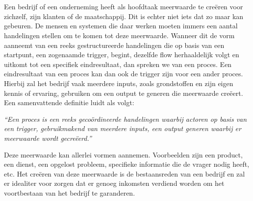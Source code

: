
\chapter{}%
\label{ch:literatuurstudie}
\section{}%
\label{sec:processen en governance}
Een bedrijf of een onderneming heeft als hoofdtaak meerwaarde te creëren voor zichzelf, zijn klanten of de maatschappij. Dit is echter niet iets dat zo maar kan gebeuren. De mensen en systemen die daar werken moeten immers een aantal handelingen stellen om te komen tot deze meerwaarde. Wanneer dit de vorm aanneemt van een reeks gestructureerde handelingen die op basis van een startpunt, een zogenaamde trigger, begint, dezelfde flow herhaaldelijk volgt en uitkomt tot een specifiek eindresultaat, dan spreken we van een proces. Een eindresultaat van een proces kan dan ook de trigger zijn voor een ander proces. Hierbij zal het bedrijf vaak meerdere inputs, zoals grondstoffen en zijn eigen kennis of ervaring, gebruiken om een output te generen die meerwaarde creëert. Een samenvattende definitie luidt als volgt:
\begin{center}
\textit{“Een proces is een reeks gecoördineerde handelingen waarbij actoren op basis van een trigger, gebruikmakend van meerdere inputs, een output generen waarbij er meerwaarde wordt gecreëerd.”}
\end{center}\newline

Deze meerwaarde kan allerlei vormen aannemen. Voorbeelden zijn een product, een dienst, een opgelost probleem, specifieke informatie die de vrager nodig heeft, etc. Het creëren van deze meerwaarde is de bestaansreden van een bedrijf en zal er idealiter voor zorgen dat er genoeg inkomsten verdiend worden om het voortbestaan van het bedrijf te garanderen.\autocite[p. 4]{Dumas2018} \autocite[p. 5]{Weske2019} \newline


